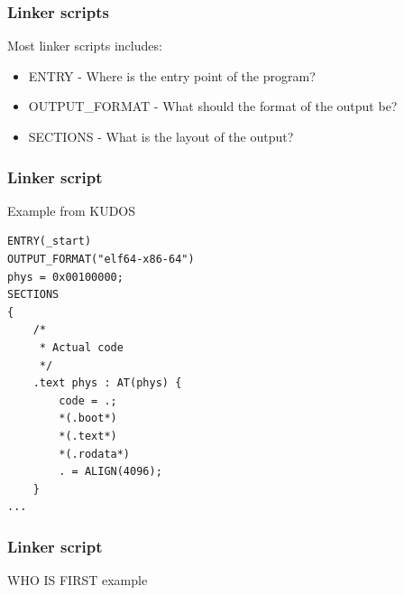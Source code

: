 \begin{frame}
\frametitle{Linker scripts}

\vspace{\fill}
Most linker scripts includes:
\begin{itemize}
    \item ENTRY - Where is the entry point of the program?
    \item OUTPUT\_FORMAT - What should the format of the output be?
    \item SECTIONS - What is the layout of the output?
\end{itemize}

\end{frame}
\begin{frame}[fragile]
\frametitle{Linker script}
\vspace{\fill}
Example from KUDOS
\vspace{\fill}

\begin{lstlisting}
ENTRY(_start)
OUTPUT_FORMAT("elf64-x86-64")
phys = 0x00100000;
SECTIONS
{
    /*
     * Actual code
     */
    .text phys : AT(phys) {
        code = .;
        *(.boot*)
        *(.text*)
        *(.rodata*)
        . = ALIGN(4096);
    }
...
\end{lstlisting}

\vspace{\fill}

\end{frame}

\begin{frame}
    \frametitle{Linker script}
    \begin{center}
        WHO IS FIRST example
    \end{center}
\end{frame}
